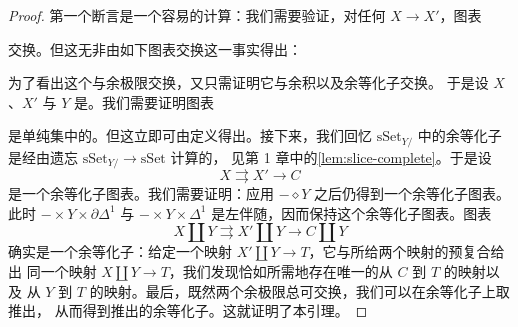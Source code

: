 \begin{proof}
第一个断言是一个容易的计算：我们需要验证，对任何\trMorphism{} $X \to X'$，图表
\begin{center}
\end{center}
交换。但这无非由如下图表交换这一事实得出：
\begin{center}
\end{center}
为了看出这个\trFunctor{}与余极限交换，又只需证明它与余积以及余等化子交换。
于是设 $X$、$X'$ 与 $Y$ 是\trSimplicialSets{}。我们需要证明图表
\begin{center}
\end{center}
是单纯集中的\trPushout{}。但这立即可由定义得出。接下来，我们回忆 $\mathrm{sSet}_{Y/}$
中的余等化子是经由遗忘\trFunctor{} $\mathrm{sSet}_{Y/} \to \mathrm{sSet}$ 计算的，
见第 1 章中的\cref{lem:slice-complete}。于是设
\[
X \rightrightarrows X' \longrightarrow C
\]
是一个余等化子图表。我们需要证明：应用 $- \diamond Y$ 之后仍得到一个余等化子图表。
此时\trFunctor{} $- \times Y \times \partial\Delta^1$ 与 $- \times Y \times \Delta^1$
是左伴随，因而保持这个余等化子图表。图表
\[
X \amalg Y \rightrightarrows X' \amalg Y \longrightarrow C \amalg Y
\]
确实是一个余等化子：给定一个映射 $X' \amalg Y \to T$，它与所给两个映射的预复合给出
同一个映射 $X \amalg Y \to T$，我们发现恰如所需地存在唯一的从 $C$ 到 $T$ 的映射以及
从 $Y$ 到 $T$ 的映射。最后，既然两个余极限总可交换，我们可以在余等化子上取推出，
从而得到推出的余等化子。这就证明了本引理。
\end{proof}

